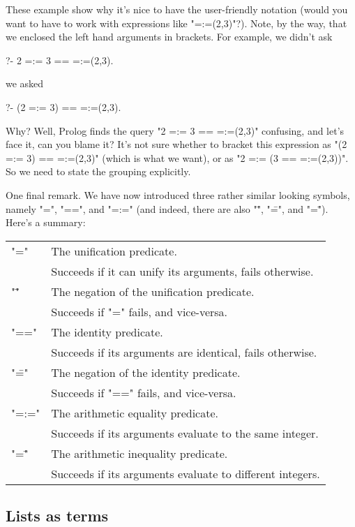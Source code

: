 These example show why it's nice to have the user-friendly notation
(would you want to have to work with expressions like
"=:=(2,3)"?). Note, by the way, that we enclosed the left hand
arguments in brackets. For example, we didn't ask
\begin{LPNcodedisplay}
?- 2 =:= 3 == =:=(2,3).
\end{LPNcodedisplay}
we asked
\begin{LPNcodedisplay}
?- (2 =:= 3) == =:=(2,3).
\end{LPNcodedisplay}
Why?  Well, Prolog finds the query "2 =:= 3 == =:=(2,3)" confusing,
and let's face it,  can you blame it?  It's not sure whether to bracket
this expression as "(2 =:= 3) == =:=(2,3)" (which is what we want), or
as "2 =:= (3 == =:=(2,3))".  So we need to state the grouping
explicitly.

One final remark.  We have now introduced three rather similar looking
symbols, namely "=", "==", and "=:=" (and indeed, there are
also "\=", "\==", and "=\=").  Here's a summary:

\begin{center}\begin{tabular}{ll}
"="&The unification predicate.\\
\strut&Succeeds if it can
        unify its arguments, fails otherwise.\\
"\="&The negation of the  unification predicate.\\
\strut&Succeeds if "=" fails, and vice-versa.\\
"=="&The identity predicate.\\
\strut&Succeeds if its arguments
        are identical, fails otherwise.\\
"\=="&The negation of the  identity predicate.\\
\strut&Succeeds if "==" fails, and vice-versa.\\
"=:="&The arithmetic equality predicate.\\
\strut&Succeeds if its arguments evaluate to the same integer.\\
"=\="&The arithmetic inequality predicate.\\
\strut&Succeeds if its
arguments evaluate to different integers.
\end{tabular}\end{center}



\subsection*{Lists as terms}\label{SUBSEC.L9.LIST.TERMS}




